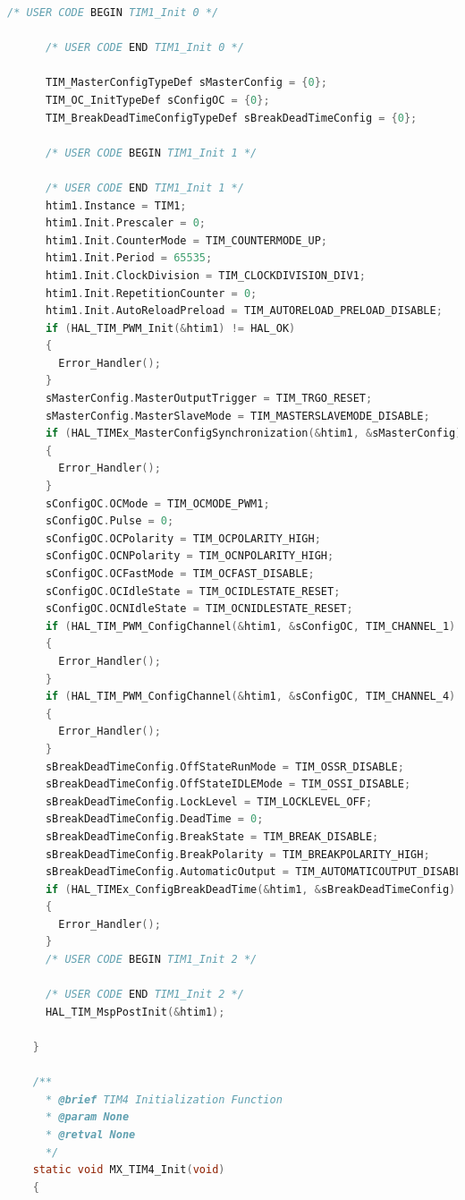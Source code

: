 \begin{lstlisting}[language=C, caption=メインコード(main.c)]
      /* USER CODE BEGIN TIM1_Init 0 */
    
      /* USER CODE END TIM1_Init 0 */
    
      TIM_MasterConfigTypeDef sMasterConfig = {0};
      TIM_OC_InitTypeDef sConfigOC = {0};
      TIM_BreakDeadTimeConfigTypeDef sBreakDeadTimeConfig = {0};
    
      /* USER CODE BEGIN TIM1_Init 1 */
    
      /* USER CODE END TIM1_Init 1 */
      htim1.Instance = TIM1;
      htim1.Init.Prescaler = 0;
      htim1.Init.CounterMode = TIM_COUNTERMODE_UP;
      htim1.Init.Period = 65535;
      htim1.Init.ClockDivision = TIM_CLOCKDIVISION_DIV1;
      htim1.Init.RepetitionCounter = 0;
      htim1.Init.AutoReloadPreload = TIM_AUTORELOAD_PRELOAD_DISABLE;
      if (HAL_TIM_PWM_Init(&htim1) != HAL_OK)
      {
        Error_Handler();
      }
      sMasterConfig.MasterOutputTrigger = TIM_TRGO_RESET;
      sMasterConfig.MasterSlaveMode = TIM_MASTERSLAVEMODE_DISABLE;
      if (HAL_TIMEx_MasterConfigSynchronization(&htim1, &sMasterConfig) != HAL_OK)
      {
        Error_Handler();
      }
      sConfigOC.OCMode = TIM_OCMODE_PWM1;
      sConfigOC.Pulse = 0;
      sConfigOC.OCPolarity = TIM_OCPOLARITY_HIGH;
      sConfigOC.OCNPolarity = TIM_OCNPOLARITY_HIGH;
      sConfigOC.OCFastMode = TIM_OCFAST_DISABLE;
      sConfigOC.OCIdleState = TIM_OCIDLESTATE_RESET;
      sConfigOC.OCNIdleState = TIM_OCNIDLESTATE_RESET;
      if (HAL_TIM_PWM_ConfigChannel(&htim1, &sConfigOC, TIM_CHANNEL_1) != HAL_OK)
      {
        Error_Handler();
      }
      if (HAL_TIM_PWM_ConfigChannel(&htim1, &sConfigOC, TIM_CHANNEL_4) != HAL_OK)
      {
        Error_Handler();
      }
      sBreakDeadTimeConfig.OffStateRunMode = TIM_OSSR_DISABLE;
      sBreakDeadTimeConfig.OffStateIDLEMode = TIM_OSSI_DISABLE;
      sBreakDeadTimeConfig.LockLevel = TIM_LOCKLEVEL_OFF;
      sBreakDeadTimeConfig.DeadTime = 0;
      sBreakDeadTimeConfig.BreakState = TIM_BREAK_DISABLE;
      sBreakDeadTimeConfig.BreakPolarity = TIM_BREAKPOLARITY_HIGH;
      sBreakDeadTimeConfig.AutomaticOutput = TIM_AUTOMATICOUTPUT_DISABLE;
      if (HAL_TIMEx_ConfigBreakDeadTime(&htim1, &sBreakDeadTimeConfig) != HAL_OK)
      {
        Error_Handler();
      }
      /* USER CODE BEGIN TIM1_Init 2 */
    
      /* USER CODE END TIM1_Init 2 */
      HAL_TIM_MspPostInit(&htim1);
    
    }
    
    /**
      * @brief TIM4 Initialization Function
      * @param None
      * @retval None
      */
    static void MX_TIM4_Init(void)
    {
    

\end{lstlisting}
